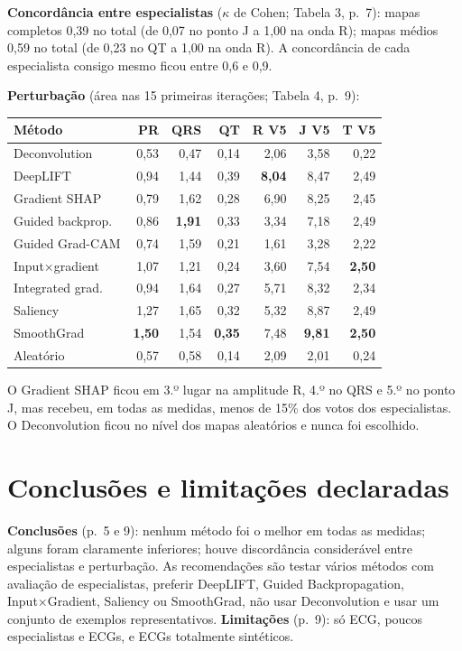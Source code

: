 \documentclass[11pt,a4paper]{article}
\begin{document}
\textbf{Concordância entre especialistas} ($\kappa$ de Cohen; Tabela 3, p.~7): mapas completos 0,39 no total (de 0,07 no ponto J a 1,00 na onda R); mapas médios 0,59 no total (de 0,23 no QT a 1,00 na onda R). A concordância de cada especialista consigo mesmo ficou entre 0,6 e 0,9.

\textbf{Perturbação} (área nas 15 primeiras iterações; Tabela 4, p.~9):
\begin{center}\small
\begin{tabular}{lrrrrrr}
\toprule
\textbf{Método} & \textbf{PR} & \textbf{QRS} & \textbf{QT} & \textbf{R V5} & \textbf{J V5} & \textbf{T V5} \\
\midrule
Deconvolution & 0,53 & 0,47 & 0,14 & 2,06 & 3,58 & 0,22 \\
DeepLIFT & 0,94 & 1,44 & 0,39 & \textbf{8,04} & 8,47 & 2,49 \\
Gradient SHAP & 0,79 & 1,62 & 0,28 & 6,90 & 8,25 & 2,45 \\
Guided backprop. & 0,86 & \textbf{1,91} & 0,33 & 3,34 & 7,18 & 2,49 \\
Guided Grad-CAM & 0,74 & 1,59 & 0,21 & 1,61 & 3,28 & 2,22 \\
Input×gradient & 1,07 & 1,21 & 0,24 & 3,60 & 7,54 & \textbf{2,50} \\
Integrated grad. & 0,94 & 1,64 & 0,27 & 5,71 & 8,32 & 2,34 \\
Saliency & 1,27 & 1,65 & 0,32 & 5,32 & 8,87 & 2,49 \\
SmoothGrad & \textbf{1,50} & 1,54 & \textbf{0,35} & 7,48 & \textbf{9,81} & \textbf{2,50} \\
Aleatório & 0,57 & 0,58 & 0,14 & 2,09 & 2,01 & 0,24 \\
\bottomrule
\end{tabular}
\end{center}
O Gradient SHAP ficou em 3.º lugar na amplitude R, 4.º no QRS e 5.º no ponto J, mas recebeu, em todas as medidas, menos de 15\% dos votos dos especialistas. O Deconvolution ficou no nível dos mapas aleatórios e nunca foi escolhido.

\section{Conclusões e limitações declaradas}
\textbf{Conclusões} (p.~5 e 9): nenhum método foi o melhor em todas as medidas; alguns foram claramente inferiores; houve discordância considerável entre especialistas e perturbação. As recomendações são testar vários métodos com avaliação de especialistas, preferir DeepLIFT, Guided Backpropagation, Input×Gradient, Saliency ou SmoothGrad, não usar Deconvolution e usar um conjunto de exemplos representativos. \textbf{Limitações} (p.~9): só ECG, poucos especialistas e ECGs, e ECGs totalmente sintéticos.
\end{document}
